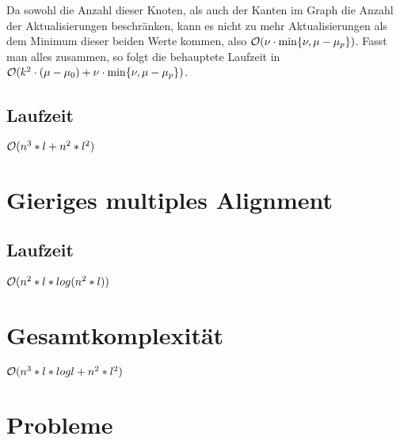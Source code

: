 \begin{beweis}
	Da sowohl die Anzahl dieser Knoten, als auch der Kanten im Graph die Anzahl der Aktualisierungen beschränken, kann es nicht zu mehr Aktualisierungen als dem Minimum dieser beiden Werte kommen, also $\mathcal{O}(\nu \cdot \min\{\nu, \mu - \mu_p\})$. Fasst man alles zusammen, so folgt die behauptete Laufzeit in $\mathcal{O}(k^2 \cdot (\mu - \mu_0) + \nu \cdot \min\{\nu, \mu - \mu_p\})$.
\end{beweis}

\subsection{Laufzeit}
$\mathcal{O}(n^3*l + n^2*l^2)$

\section{Gieriges multiples Alignment}

\subsection{Laufzeit}
$\mathcal{O}(n^2*l*log(n^2*l))$

\section{Gesamtkomplexität}
$\mathcal{O}(n^3*l*log l + n^2*l^2)$

\section{Probleme}
